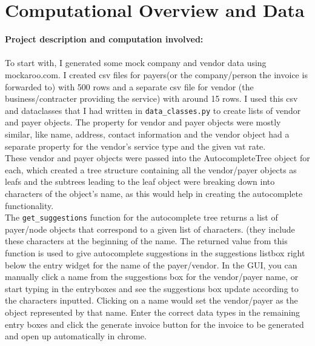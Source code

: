 \documentclass[fontsize=11pt]{article}
\begin{document}
    \section*{Computational Overview and Data}
    \noindent
    \textbf{Project description and computation involved:} \\
    \\
    To start with, I generated some mock company and vendor data using mockaroo.com. I created csv files for payers(or the company/person the invoice is forwarded to) with 500 rows and a separate csv file for vendor (the business/contracter providing the service) with around 15 rows. I used this csv and dataclasses that I had written in \texttt{data\_classes.py} to create lists of vendor and payer objects. The property for vendor and payer objects were mostly similar, like name, address, contact information and the vendor object had a separate property for the vendor's service type and the given vat rate.
    \\
    These vendor and payer objects were passed into the AutocompleteTree object for each, which created a tree structure containing all the vendor/payer objects as leafs and the subtrees leading to the leaf object were breaking down into characters of the object's name, as this would help in creating the autocomplete functionality.
    \\
    The \texttt{get\_suggestions} function for the autocomplete tree returns a list of payer/node objects that correspond to a given list of characters. (they include these characters at the beginning of the name. The returned value from this function is used to give autocomplete suggestions in the suggestions listbox right below the entry widget for the name of the payer/vendor.
    In the GUI, you can manually click a name from the suggestions box for the vendor/payer name, or start typing in the entryboxes and see the suggestions box update according to the characters inputted. Clicking on a name would set the vendor/payer as the object represented by that name. Enter the correct data types in the remaining entry boxes and click the generate invoice button for the invoice to be generated and open up automatically in chrome.
    \\
\end{document}
